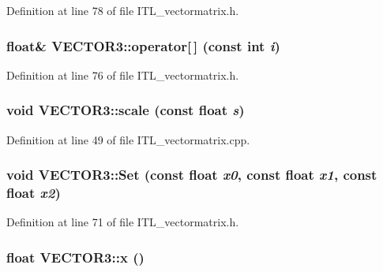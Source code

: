 Definition at line 78 of file ITL\_\-vectormatrix.h.

\hypertarget{classVECTOR3_ad036f6898236422beeb85ea329ee510f}{
\subsubsection[{operator[]}]{\setlength{\rightskip}{0pt plus 5cm}float\& VECTOR3::operator\mbox{[}$\,$\mbox{]} (const int {\em i})}}
\label{classVECTOR3_ad036f6898236422beeb85ea329ee510f}


Definition at line 76 of file ITL\_\-vectormatrix.h.

\hypertarget{classVECTOR3_a7b9d1162d5fd227a4cbbd254839e270c}{
\subsubsection[{scale}]{\setlength{\rightskip}{0pt plus 5cm}void VECTOR3::scale (const float {\em s})}}
\label{classVECTOR3_a7b9d1162d5fd227a4cbbd254839e270c}


Definition at line 49 of file ITL\_\-vectormatrix.cpp.

\hypertarget{classVECTOR3_a032256fc81e39310d30a38fb303ce48f}{
\subsubsection[{Set}]{\setlength{\rightskip}{0pt plus 5cm}void VECTOR3::Set (const float {\em x0}, \/  const float {\em x1}, \/  const float {\em x2})}}
\label{classVECTOR3_a032256fc81e39310d30a38fb303ce48f}


Definition at line 71 of file ITL\_\-vectormatrix.h.

\hypertarget{classVECTOR3_ac05d9ef1b78723c720085c2d914bf504}{
\subsubsection[{x}]{\setlength{\rightskip}{0pt plus 5cm}float VECTOR3::x ()}}
\label{classVECTOR3_ac05d9ef1b78723c720085c2d914bf504}



